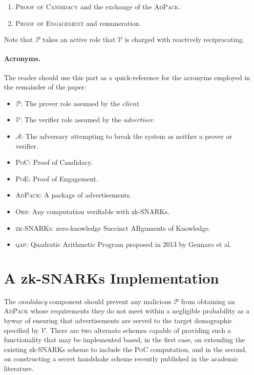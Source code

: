 \documentclass{article}
\begin{document}
			\begin{enumerate}
				
				\item \textsc{Proof of Candidacy }and the exchange of the \textsc{AdPack}.
				\item \textsc{Proof of Engagement} and remuneration.
		
			\end{enumerate}
		
		Note that $\mathcal{P}$ takes an active role that $\mathcal{V}$ is charged with reactively reciprocating. 
		
		\paragraph{Acronyms.} The reader should use this part as a quick-reference for the acronyms employed in the remainder of the paper:
		
			\begin{itemize}[label = $\cdot$]
				
				\item $\mathcal{P}$: The prover role  assumed by the \textit{client}.
				\item $\mathcal{V}$: The verifier role assumed by the \textit{advertiser}.
				\item $\mathcal{A}$: The adversary attempting to break the system as neither a prover or verifier.
				\item \textsc{PoC}: Proof of Candidacy.
				\item \textsc{PoE}: Proof of Engagement.
				\item \textsc{AdPack}: A package of advertisements.
				\item \textsc{Orb}: Any computation verifiable with zk-SNARKs.
				\item \textsc{zk-SNARKs}: zero-knowledge Succinct ARguments of Knowledge.
				\item \textsc{qap}: Quadratic Arithmetic Program proposed in 2013 by Gennaro et al.
				
			\end{itemize}
		
\pagebreak
		
	\section{A zk-SNARKs Implementation}
		
		The \textit{candidacy} component should prevent any malicious $\mathcal{P}$ from obtaining an \textsc{AdPack} whose requirements they do not meet within a negligible probability as a byway of ensuring that advertisements are served to the target demographic specified by $\mathcal{V}$. There are two alternate schemes capable of providing such a functionality that  may be implemented based, in the first case, on extending the existing zk-SNARKs scheme to include the \textsc{PoC} computation, and in the second, on constructing a secret handshake scheme recently published in the academic literature.
		
\end{document}
